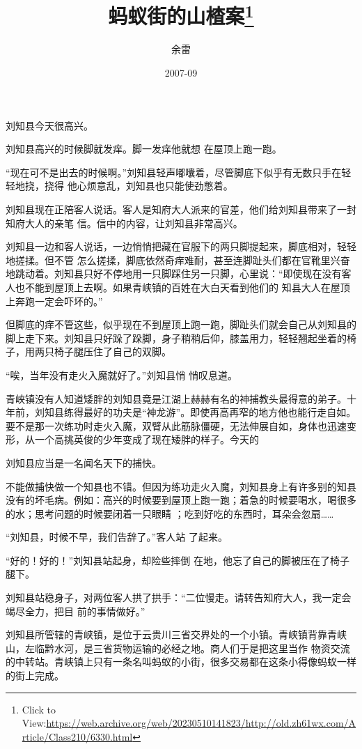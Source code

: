 \documentclass{article}
\title{蚂蚁街的山楂案\footnote{Click to View:\url{https://web.archive.org/web/20230510141823/http://old.zh61wx.com/Article/Class210/6330.html}}}
\author{余雷}
\date{2007-09}
\begin{document}

\maketitle


\Large


﻿刘知县今天很高兴。 

刘知县高兴的时候脚就发痒。脚一发痒他就想
在屋顶上跑一跑。 

“现在可不是出去的时候啊。”刘知县轻声嘟囔着，尽管脚底下似乎有无数只手在轻轻地挠，挠得
他心烦意乱，刘知县也只能使劲憋着。 

刘知县现在正陪客人说话。客人是知府大人派来的官差，他们给刘知县带来了一封知府大人的亲笔
信。信中的内容，让刘知县非常高兴。 

刘知县一边和客人说话，一边悄悄把藏在官服下的两只脚提起来，脚底相对，轻轻地搓揉。但不管
\newpage
怎么搓揉，脚底依然奇痒难耐，甚至连脚趾头们都在官靴里兴奋地跳动着。刘知县只好不停地用一只脚踩住另一只脚，心里说：“即使现在没有客人也不能到屋顶上去啊。如果青峡镇的百姓在大白天看到他们的
知县大人在屋顶上奔跑一定会吓坏的。” 

但脚底的痒不管这些，似乎现在不到屋顶上跑一跑，脚趾头们就会自己从刘知县的脚上走下来。刘知县只好跺了跺脚，身子稍稍后仰，膝盖用力，轻轻翘起坐着的椅子，用两只椅子腿压住了自己的双脚。
 

“唉，当年没有走火入魔就好了。”刘知县悄
悄叹息道。 

青峡镇没有人知道矮胖的刘知县竟是江湖上赫赫有名的神捕教头最得意的弟子。十年前，刘知县练得最好的功夫是“神龙游”。即使再高再窄的地方他也能行走自如。要不是那一次练功时走火入魔，双臂从此筋脉僵硬，无法伸展自如，身体也迅速变形，从一个高挑英俊的少年变成了现在矮胖的样子。今天的
\newpage

刘知县应当是一名闻名天下的捕快。 

不能做捕快做一个知县也不错。但因为练功走火入魔，刘知县身上有许多别的知县没有的坏毛病。例如：高兴的时候要到屋顶上跑一跑；着急的时候要喝水，喝很多的水；思考问题的时候要闭着一只眼睛
；吃到好吃的东西时，耳朵会忽扇…… 

“刘知县，时候不早，我们告辞了。”客人站
了起来。 

“好的！好的！”刘知县站起身，却险些摔倒
在地，他忘了自己的脚被压在了椅子腿下。 

刘知县站稳身子，对两位客人拱了拱手：“二位慢走。请转告知府大人，我一定会竭尽全力，把目
前的事情做好。” 

刘知县所管辖的青峡镇，是位于云贵川三省交界处的一个小镇。青峡镇背靠青峡山，左临黔水河，是三省货物运输的必经之地。商人们于是把这里当作
\newpage
物资交流的中转站。青峡镇上只有一条名叫蚂蚁的小街，很多交易都在这条小得像蚂蚁一样的街上完成。
\end{document}
